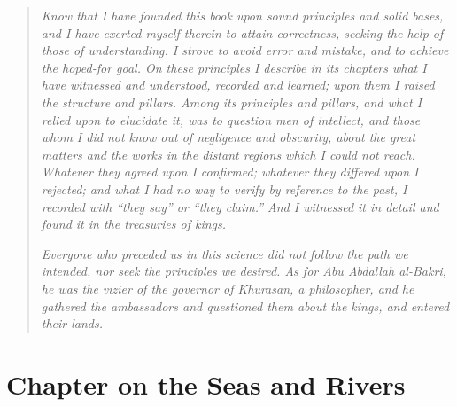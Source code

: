 \documentclass[11pt,a4paper]{article}
\newcommand{\arheading}[1]{{\centering\arabicheadingfont\textcolor{arabicblue}{\RL{#1}}\par}}
\begin{document}
\begin{quote}
\small
\textit{Know that I have founded this book upon sound principles and solid bases, and I have exerted myself therein to attain correctness, seeking the help of those of understanding. I strove to avoid error and mistake, and to achieve the hoped-for goal. On these principles I describe in its chapters what I have witnessed and understood, recorded and learned; upon them I raised the structure and pillars. Among its principles and pillars, and what I relied upon to elucidate it, was to question men of intellect, and those whom I did not know out of negligence and obscurity, about the great matters and the works in the distant regions which I could not reach. Whatever they agreed upon I confirmed; whatever they differed upon I rejected; and what I had no way to verify by reference to the past, I recorded with ``they say'' or ``they claim.'' And I witnessed it in detail and found it in the treasuries of kings.}

\smallskip
\textit{Everyone who preceded us in this science did not follow the path we intended, nor seek the principles we desired. As for Abu Abdallah al-Bakri, he was the vizier of the governor of Khurasan, a philosopher, and he gathered the ambassadors and questioned them about the kings, and entered their lands.}
\end{quote}

\clearpage


\section*{Chapter on the Seas and Rivers}

\arheading{ذِكْرُ الْبِحَارِ وَالْأَنْهَارِ}

\vspace{0.5cm}

{\small\arabicfont
{}}
\end{document}
